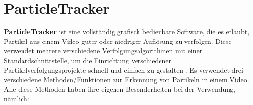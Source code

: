 
\section{ParticleTracker \label{kap1_ParticleTracker}}
\textbf{ParticleTracker} ist eine vollständig grafisch bedienbare Software, die es erlaubt, Partikel aus einem Video guter oder niedriger Auflösung zu verfolgen. Diese verwendet mehrere verschiedene Verfolgungsalgorithmen mit einer Standardschnittstelle, um die Einrichtung verschiedener Partikelverfolgungsprojekte schnell und einfach zu gestalten \cite{Smith2021}.
Es verwendet drei verschiedene Methoden/Funktionen zur Erkennung von Partikeln in einem Video. Alle diese Methoden haben ihre eigenen Besonderheiten bei der Verwendung, nämlich:
